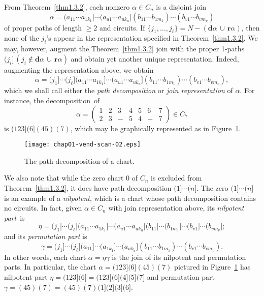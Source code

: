 \documentclass{surv-l}
\numberwithin{equation}{section}
\numberwithin{table}{section}
\numberwithin{figure}{section}
\theoremstyle{plain}
\theoremstyle{definition}
\begin{document}
From Theorem~\ref{thm1.3.2}, each nonzero
$\alpha\in C_{n}$ is a disjoint join
\[
\alpha=(a_{11}\cdots a_{1k_{1}}]\cdots(a_{u1}\cdots a_{uk_{u}}]
(b_{11}\cdots b_{1m_{1}})\cdots(b_{v1}\cdots b_{vm_{v}})
\]
of proper paths of length $\geq 2$ and circuits. If
$\{j_{1},\ldots, j_{\ell}\}=N-(\mathbf{d}\alpha\,\cup\,
\mathbf{r}\alpha)$, then none of the $j_{i}$'s appear in the
representation specified in Theorem~\ref{thm1.3.2}. We may,
however, augment the Theorem~\ref{thm1.3.2} join with the proper
1-paths $(j_{i}]\,(j_{i}\not\in \mathbf{d}\alpha\,\cup\,
\mathbf{r}\alpha)$ and obtain yet another unique representation.
Indeed, augmenting the representation above, we
obtain\index{$\ell$}
\[
\alpha=(j_{1}]\cdots(j_{\ell}](a_{11}\cdots
a_{1k_{1}}]\cdots(a_{u1}\cdots a_{uk_{u}}](b_{11}\cdots
b_{1m_{1}})\cdots(b_{v1}\cdots b_{vm_{v}}),
\]
which we shall call either the \emph{path
decomposition} or \emph{join
representation} of $\alpha$.
For instance, the decomposition~of
\[
\alpha=\left(\begin{matrix}
1 & 2 & 3 & 4 & 5 & 6 & 7\\
2 & 3 & - & 5 & 4 & - & 7
\end{matrix}\right)\in C_{7}
\]
is ($123](6](45)(7)$, which may be graphically represented as in
Figure~\ref{fig1.3.3}.

\setcounter{figure}{2}
\begin{figure}[!h]
\texttt{[image: chap01-vend-scan-02.eps]}
\caption{The path decomposition of a chart.}\label{fig1.3.3}
\end{figure}

We also note that while the zero chart $0$ of
$C_{n}$ is excluded from Theorem~\ref{thm1.3.2}, it does have path
decomposition $(1]\cdots (n]$. The zero $(1]\cdots (n]$ is an
example of a \emph{nilpotent}, which is a chart whose path
decomposition contains no circuits. In fact, given $\alpha\in
C_{n}$ with join representation above, its \emph{nilpotent
part}~is
\[
\eta=(j_{1}]\cdots(j_{\ell}](a_{11}\cdots
a_{1k_{1}}]\cdots(a_{u1}\cdots
a_{uk_{u}}](b_{11}]\cdots(b_{1m_{1}}]\cdots(b_{v1}]\cdots(b_{vm_{v}}];
\]
and its \emph{permutation part} is
\[
\gamma=(j_{1}]\cdots(j_{\ell}](a_{11}]\cdots(a_{1k_{1}}]\cdots(a_{uk_{u}}](b_{11}\cdots
b_{1m_{1}})\cdots(b_{v1}\cdots b_{vm_{v}}).
\]
In other words, each chart $\alpha=\eta\gamma$ is the join of its
nilpotent and permutation parts. In
particular, the chart $\alpha=(123](6](45)(7)$ pictured in
Figure~\ref{fig1.3.3} has nilpotent part
$\eta=(123](6]=(123](6](4](5](7]$ and permutation part
$\gamma=(45)(7)=(45)(7)(1](2](3](6]$.
\end{document}
